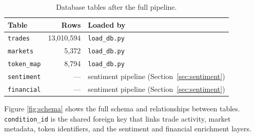 \documentclass[11pt]{article}
\begin{document}
\begin{table}[H]
\centering
\caption{Database tables after the full pipeline.}
\label{tab:rowcounts}
\small
\begin{tabularx}{\textwidth}{l r X}
\toprule
\textbf{Table} & \textbf{Rows} & \textbf{Loaded by} \\
\midrule
\texttt{trades}     & 13{,}010{,}594 & \texttt{load\_db.py} \\
\texttt{markets}    &      5{,}372   & \texttt{load\_db.py} \\
\texttt{token\_map} &      8{,}794   & \texttt{load\_db.py} \\
\texttt{sentiment}  &        ---     & sentiment pipeline
                                       (Section~\ref{sec:sentiment}) \\
\texttt{financial}  &        ---     & sentiment pipeline
                                       (Section~\ref{sec:sentiment}) \\
\bottomrule
\end{tabularx}
\end{table}

\noindent Figure \ref{fig:schema} shows the full schema and
relationships between tables.  \texttt{condition\_id} is the shared
foreign key that links trade activity, market metadata, token
identifiers, and the sentiment and financial enrichment layers.
\end{document}
